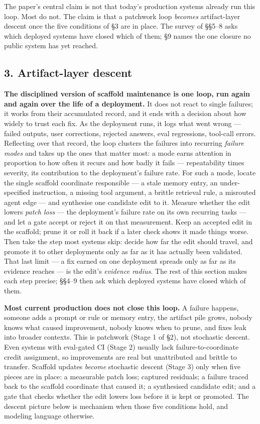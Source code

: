 The paper's central claim is not that today's production systems already
run this loop. Most do not. The claim is that a patchwork loop
\emph{becomes} artifact-layer descent once the five conditions of §3 are
in place. The survey of §§5--8 asks which deployed systems have closed
which of them; §9 names the one closure no public system has yet
reached.

\subsection{3. Artifact-layer descent}\label{artifact-layer-descent}

\textbf{The disciplined version of scaffold maintenance is one loop, run
again and again over the life of a deployment.} It does not react to
single failures; it works from their accumulated record, and it ends
with a decision about how widely to trust each fix. As the deployment
runs, it logs what went wrong --- failed outputs, user corrections,
rejected answers, eval regressions, tool-call errors. Reflecting over
that record, the loop clusters the failures into recurring \emph{failure
modes} and takes up the ones that matter most: a mode earns attention in
proportion to how often it recurs and how badly it fails ---
repeatability times severity, its contribution to the deployment's
failure rate. For such a mode, locate the single scaffold
coordinate responsible --- a stale memory entry, an under-specified
instruction, a missing tool argument, a brittle retrieval rule, a
misrouted agent edge --- and synthesise one candidate edit to it.
Measure whether the edit lowers \emph{patch loss} --- the deployment's
failure rate on its own recurring tasks --- and let a gate accept or
reject it on that measurement. Keep an accepted edit in the scaffold;
prune it or roll it back if a later check shows it made things worse.
Then take the step most systems skip: decide how far the edit should
travel, and promote it to other deployments only as far as it has
actually been validated. That last limit --- a fix earned on one
deployment spreads only as far as its evidence reaches --- is the edit's
\emph{evidence radius}. The rest of this section makes each step
precise; §§4--9 then ask which deployed systems have closed which of
them.

\textbf{Most current production does not close this loop.} A failure
happens, someone adds a prompt or rule or memory entry, the artifact
pile grows, nobody knows what caused improvement, nobody knows when to
prune, and fixes leak into broader contexts. This is patchwork (Stage 1
of §2), not stochastic descent. Even systems with eval-gated CI (Stage
2) usually lack failure-to-coordinate credit assignment, so improvements
are real but unattributed and brittle to transfer. Scaffold updates
\emph{become} stochastic descent (Stage 3) only when five pieces are in
place: a measurable patch loss; captured residuals; a failure traced
back to the scaffold coordinate that caused it; a synthesised candidate
edit; and a gate that checks whether the edit lowers loss before it is
kept or promoted. The descent picture below is mechanism when those five
conditions hold, and modeling language otherwise.

